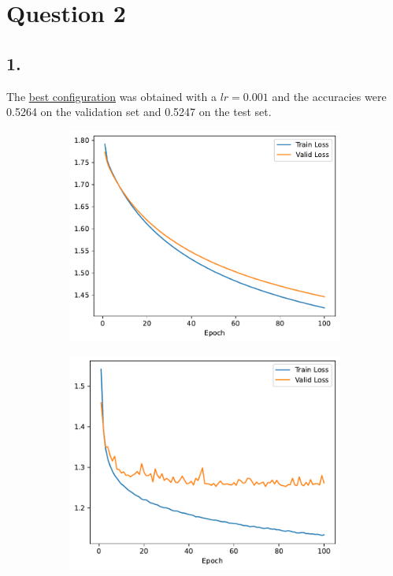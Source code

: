 \documentclass[a4paper, 12pt]{article}
\begin{document}
\section*{Question 2}
\subsection*{1.}
The \underline{best configuration} was obtained with a $lr = 0.001$ and the accuracies were 0.5264 on the validation set and 0.5247 on the test set.
\begin{figure}[H]
    \centering
     \begin{subfigure}{0.30\textwidth}
        \includegraphics[width=\textwidth]{plot/logistic_regression-training-loss-batch-32-lr-1e-05-epochs-100-l2-0.01-opt-sgd.pdf}
        \label{fig:lr_0.00001}
    \end{subfigure}
    \hfill
    \begin{subfigure}{0.30
    \textwidth}
        \includegraphics[width=\textwidth]{plot/logistic_regression-training-loss-batch-32-lr-0.001-epochs-100-l2-0.01-opt-sgd.pdf}

\end{subfigure}
\end{figure}
\end{document}
